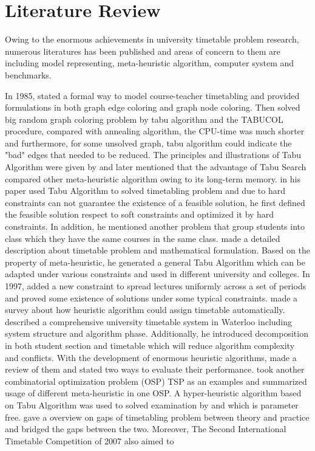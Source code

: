 \documentclass{article}
\begin{document}
\newpage

\section{Literature Review}
\label{sec: Literature Review}

Owing to the enormous achievements in university timetable problem research, numerous literatures has been published and areas of concern to them are including model representing, meta-heuristic algorithm, computer system and benchmarks.

In 1985, \citet{(werra1985)introduction} stated a formal way to model course-teacher timetabling and provided formulations in both graph edge coloring and graph node coloring. Then \cite{(hertz1987)using} solved big random graph coloring problem by tabu algorithm and the TABUCOL procedure, compared with annealing algorithm, the CPU-time was much shorter and furthermore, for some unsolved graph, tabu algorithm could indicate the "bad" edges that needed to be reduced. The principles and illustrations of Tabu Algorithm were given by \cite{(werra1989)tabu} and later \cite{(glover1990)tabu} mentioned that the advantage of Tabu Search compared other meta-heuristic algorithm owing to its long-term memory. \cite{(hertz1991)tabu} in his paper used Tabu Algorithm to solved timetabling problem and due to hard constraints can not guarantee the existence of a feasible solution, he first defined the feasible solution respect to soft constraints and optimized it by hard constraints. In addition, he mentioned another problem that group students into class which they have the same courses in the same class. \cite{(costa1994)tabu} made a detailed description about timetable problem and mathematical formulation. Based on the property of meta-heuristic, he generated a general Tabu Algorithm which can be adapted under various constraints and used in different university and colleges. In 1997, \cite{(werra1997)combinatorics} added a new constraint to spread lectures uniformly across a set of periods and proved some existence of solutions under some typical constraints. \cite{(schaerf1999)survey} made a survey about how heuristic algorithm could assign timetable automatically. \cite{(carter2000)comprehensive} described a comprehensive university timetable system in Waterloo including system structure and algorithm phase. Additionally, he introduced decomposition in both student section and timetable which will reduce algorithm complexity and conflicts. With the development of enormous heuristic algorithms, \cite{(silver2004)overview} made a review of them and stated two ways to evaluate their performance. \cite{(gendreau2005)metaheuristics} took another combinatorial optimization problem (OSP) TSP as an examples and summarized usage of different meta-heuristic in one OSP. A hyper-heuristic algorithm based on Tabu Algorithm was used to solved examination by \cite{(hussin2005)tabu} and \cite{(kendall2005)investigation} which is parameter free. \cite{(mccollum2006)perspective} gave a overview on gaps of timetabling problem between theory and practice and bridged the gaps between the two. Moreover, The Second International Timetable Competition of 2007 also aimed to 
\end{document}
